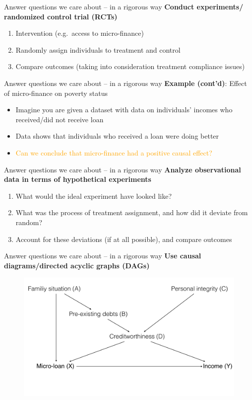 \documentclass[12pt,english,dvipsnames,aspectratio=169, handout]{beamer}
\begin{document}
\begin{frame}{Answer questions we care about -- in a rigorous way}
\textbf{Conduct experiments/ randomized control trial (RCTs)}
\begin{enumerate}
	\item Intervention (e.g.\ access to micro-finance)
	\item Randomly assign individuals to treatment and control
	\item Compare outcomes (taking into consideration treatment compliance issues)
\end{enumerate}
\end{frame}


\begin{frame}{Answer questions we care about -- in a rigorous way}
\textbf{Example (cont'd)}: Effect of micro-finance on poverty status 
\begin{itemize}
	\item Imagine you are given a dataset with data on individuals' incomes who received/did not receive loan
	\item Data shows that individuals who received a loan were doing better
	\item \textcolor{orange}{Can we conclude that micro-finance had a positive causal effect?}
\end{itemize}
\end{frame}

\begin{frame}{Answer questions we care about -- in a rigorous way}
\textbf{Analyze observational data in terms of hypothetical experiments \cite{rubin_objective_2008}}
\begin{enumerate}
	\item What would the ideal experiment have looked like?
	\item What was the process of treatment assignment, and how did it deviate from random?
	\item Account for these deviations (if at all possible), and compare outcomes
\end{enumerate}
\end{frame}

\begin{frame}{Answer questions we care about -- in a rigorous way}
\textbf{Use causal diagrams/directed acyclic graphs (DAGs) \cite{pearl_book_2018}}
    \begin{figure}
    \includegraphics[width=.8\textwidth]{../04-figures/01/03-dag_micfin}
    \end{figure}
\end{frame}
\end{document}
